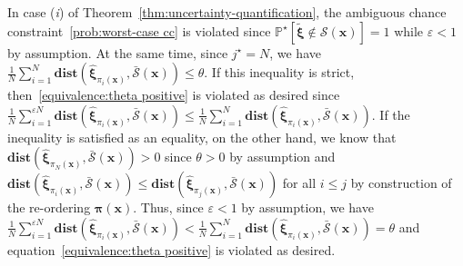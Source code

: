 \documentclass[nonblindrev]{informs2017}
\newcommand{\bmt}[1]{\tilde{\bm{#1}}}
\newcommand{\bmh}[1]{\hat{\bm{#1}}}
\newcommand{\1}[1]{\mathds{1}{\left(#1\right)}}
\begin{document}
In case (\emph{i}) of Theorem~\ref{thm:uncertainty-quantification}, the ambiguous chance constraint~\eqref{prob:worst-case cc} is violated since $\mathbb{P}^\star [\bmt{\xi} \notin \mathcal{S}(\bm{x})] = 1$ while $\varepsilon < 1$ by assumption. At the same time, since $j^\star = N$, we have $\frac{1}{N} \sum_{i = 1}^{N} \mathbf{dist}(\bmh{\xi}_{\pi_i(\bm{x})}, \bar{\mathcal{S}}(\bm{x})) \leq \theta$. If this inequality is strict, then~\eqref{equivalence:theta positive} is violated as desired since $\frac{1}{N} \sum_{i = 1}^{\varepsilon N} \mathbf{dist}(\bmh{\xi}_{\pi_i(\bm{x})}, \bar{\mathcal{S}}(\bm{x})) \leq \frac{1}{N} \sum_{i = 1}^{N} \mathbf{dist}(\bmh{\xi}_{\pi_i(\bm{x})}, \bar{\mathcal{S}}(\bm{x}))$. If the inequality is satisfied as an equality, on the other hand, we know that $\mathbf{dist}(\bmh{\xi}_{\pi_N(\bm{x})}, \bar{\mathcal{S}}(\bm{x})) > 0$ since $\theta > 0$ by assumption and $\mathbf{dist}(\bmh{\xi}_{\pi_i(\bm{x})}, \bar{\mathcal{S}}(\bm{x})) \leq \mathbf{dist}(\bmh{\xi}_{\pi_j(\bm{x})}, \bar{\mathcal{S}}(\bm{x}))$ for all $i \leq j$ by construction of the re-ordering $\bm{\pi}(\bm{x})$. Thus, since $\varepsilon < 1$ by assumption, we have $\frac{1}{N} \sum_{i = 1}^{\varepsilon N} \mathbf{dist}(\bmh{\xi}_{\pi_i(\bm{x})}, \bar{\mathcal{S}}(\bm{x})) < \frac{1}{N} \sum_{i = 1}^{N} \mathbf{dist}(\bmh{\xi}_{\pi_i(\bm{x})}, \bar{\mathcal{S}}(\bm{x})) = \theta$ and equation~\eqref{equivalence:theta positive} is violated as desired.
\end{document}
